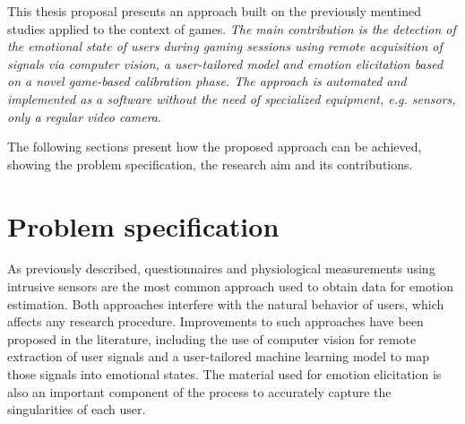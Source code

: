 This thesis proposal presents an approach built on the previously mentined studies applied to the context of games. \textit{The main contribution is the detection of the emotional state of users during gaming sessions using remote acquisition of signals via computer vision, a user-tailored model and emotion elicitation based on a novel game-based calibration phase. The approach is automated and implemented as a software without the need of specialized equipment, e.g. sensors, only a regular video camera}.


The following sections present how the proposed approach can be achieved, showing the problem specification, the research aim and its contributions.

\section{Problem specification}

As previously described, questionnaires and physiological measurements using intrusive sensors are the most common approach used to obtain data for emotion estimation. Both approaches interfere with the natural behavior of users, which affects any research procedure. Improvements to such approaches have been proposed in the literature, including the use of computer vision for remote extraction of user signals and a user-tailored machine learning model to map those signals into emotional states. The material used for emotion elicitation is also an important component of the process to accurately capture the singularities of each user.

